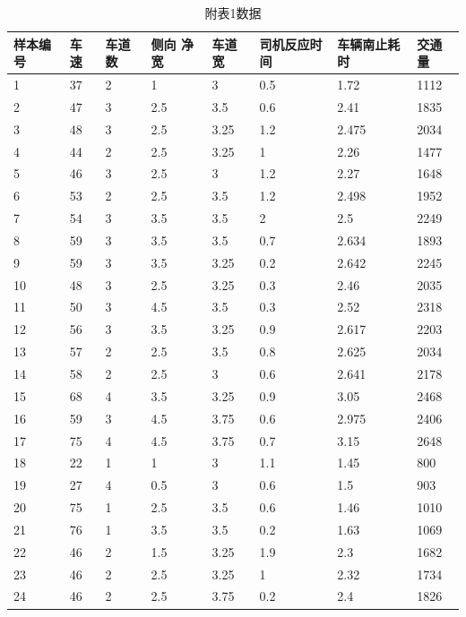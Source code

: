 
\begin{table}[h!]
  \centering
  \small\renewcommand{}
    \caption{附表1数据}
\begin{tabular*}{\linewidth}{p{45pt}<{\centering}p{25pt}<{\centering}
p{35pt}<{\centering}p{45pt}<{\centering}p{35pt}<{\centering}p{66pt}<{\centering}
p{66pt}<{\centering}p{40pt}<{\centering}}
\toprule
样本编号 &  车速 & 车道数  & 侧向 净宽 &  车道宽  &  司机反应时间  & 车辆南止耗时  &  交通量  \\
\midrule
1 & 37 {\color{Blue} } & 2 & 1 & 3 & 0.5 & 1.72 & 1112 \\
2 & 47 & 3 & 2.5 & 3.5 & 0.6 & 2.41 & 1835 \\
3 & 48 & 3 & 2.5 & 3.25 & 1.2 & 2.475 & 2034 \\
4 & 44 & 2 & 2.5 & 3.25 & 1 & 2.26 & 1477 \\
5 & 46 & 3 & 2.5 & 3 & 1.2 & 2.27 & 1648 \\
6 & 53 & 2 & 2.5 & 3.5 & 1.2 & 2.498 & 1952 \\
7 & 54 & 3 & 3.5 & 3.5 & 2 & 2.5 & 2249 \\
8 & 59 & 3 & 3.5 & 3.5 & 0.7 & 2.634 & 1893 \\
9 & 59 & 3 & 3.5 & 3.25 & 0.2 & 2.642 & 2245 \\
10 & 48 & 3 & 2.5 & 3.25 & 0.3 & 2.46 & 2035 \\
11 & 50 & 3 & 4.5 & 3.5 & 0.3 & 2.52 & 2318 \\
12 & 56 & 3 & 3.5 & 3.25 & 0.9 & 2.617 & 2203 \\
13 & 57 & 2 & 2.5 & 3.5 & 0.8 & 2.625 & 2034 \\
14 & 58 & 2 & 2.5 & 3 & 0.6 & 2.641 & 2178 \\
15 & 68 & 4 & 3.5 & 3.25 & 0.9 & 3.05 & 2468 \\
16 & 59 & 3 & 4.5 & 3.75 & 0.6 & 2.975 & 2406 \\
17 & 75 & 4 & 4.5 & 3.75 & 0.7 & 3.15 & 2648 \\
18 & 22 & 1 & 1 & 3 & 1.1 & 1.45 & 800 \\
19 & 27 & 4 & 0.5 & 3 & 0.6 & 1.5 & 903 \\
20 & 75 & 1 & 2.5 & 3.5 & 0.6 & 1.46 & 1010 \\
21 & 76 & 1 & 3.5 & 3.5 & 0.2 & 1.63 & 1069 \\
22 & 46 & 2 & 1.5 & 3.25 & 1.9 & 2.3 & 1682 \\
23 & 46 & 2 & 2.5 & 3.25 & 1 & 2.32 & 1734 \\
24 & 46 & 2 & 2.5 & 3.75 & 0.2 & 2.4 & 1826 \\

\end{tabular*}
\end{table}
